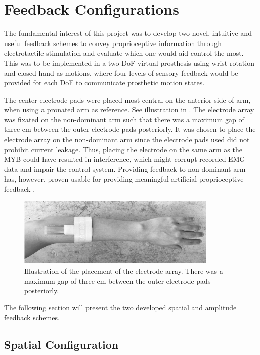 \section{Feedback Configurations} \label{sec:feed}

The fundamental interest of this project was to develop two novel, intuitive and useful feedback schemes to convey proprioceptive information through electrotactile stimulation and evaluate which one would aid control the most. This was to be implemented in a two DoF virtual prosthesis using wrist rotation and closed hand as motions, where four levels of sensory feedback would be provided for each DoF to communicate prosthetic motion states. 

The center electrode pads were placed most central on the anterior side of arm, when using a pronated arm as reference. See illustration in . The electrode array was fixated on the non-dominant arm such that there was a maximum gap of three cm between the outer electrode pads posteriorly. It was chosen to place the electrode array on the non-dominant arm since the electrode pads used did not prohibit current leakage. Thus, placing the electrode on the same arm as the MYB could have resulted in interference, which might corrupt recorded EMG data and impair the control system. Providing feedback to non-dominant arm has, however, proven usable for providing meaningful artificial proprioceptive feedback \cite{Pistohl2015}.  

\begin{figure}[H]                 
	\includegraphics[width=0.85\textwidth]{figures/elec_place}  
	\caption{Illustration of the placement of the electrode array. There was a maximum gap of three cm between the outer electrode pads posteriorly.}
	\label{fig:meth:elec_place} 
\end{figure} The following section will present the two developed spatial and amplitude feedback schemes. 

\subsection{Spatial Configuration}

